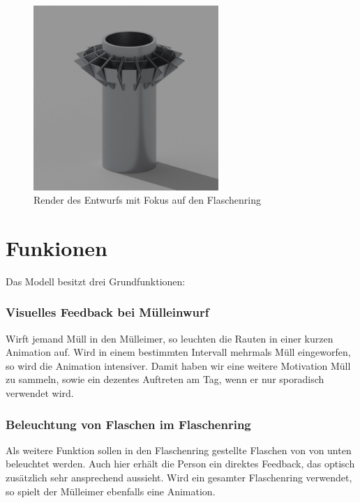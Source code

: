     \begin{figure}[H]
        \begin{center}
            \includegraphics[width=7cm]{media/01_project/render_bin.jpg}
        \end{center}
        \caption{Render des Entwurfs mit Fokus auf den Flaschenring}
        \label{fig:pencil_bin_3}
    \end{figure}

\section{Funkionen}

    Das Modell besitzt drei Grundfunktionen:

    \subsubsection{Visuelles Feedback bei Mülleinwurf}
        
        Wirft jemand Müll in den Mülleimer, so leuchten die Rauten in einer kurzen Animation auf.
        Wird in einem bestimmten Intervall mehrmals Müll eingeworfen, so wird die Animation intensiver. Damit haben wir eine weitere Motivation Müll zu sammeln, sowie ein dezentes Auftreten am Tag, wenn er nur sporadisch verwendet wird.
      

    \subsubsection{Beleuchtung von Flaschen im Flaschenring}

        Als weitere Funktion sollen in den Flaschenring gestellte Flaschen von von unten beleuchtet werden. Auch hier erhält die Person ein direktes Feedback, das optisch zusätzlich sehr ansprechend aussieht.
        Wird ein gesamter Flaschenring verwendet, so spielt der Mülleimer ebenfalls eine Animation.


